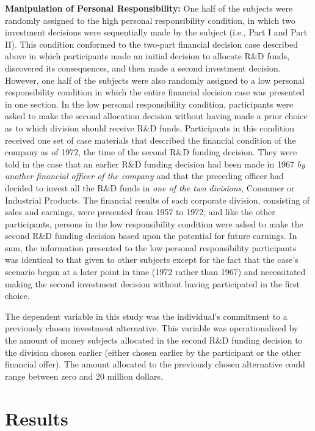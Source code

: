 \documentclass{article}
\begin{document}
\textbf{Manipulation of Personal Responsibility:} One half of the subjects were randomly assigned to the high personal responsibility condition, in which two investment decisions were sequentially made by the subject (i.e., Part I and Part II). This condition conformed to the two-part financial decision case described above in which participants made an initial decision to allocate R\&D funds, discovered its consequences, and then made a second investment decision. However, one half of the subjects were also randomly assigned to a low personal responsibility condition in which the entire financial decision case was presented in one section. In the low personal responsibility condition, participants were asked to make the second allocation decision without having made a prior choice as to which division should receive R\&D funds. Participants in this condition received one set of case materials that described the financial condition of the company as of 1972, the time of the second R\&D funding decision. They were told in the case that an earlier R\&D funding decision had been made in 1967 \textit{by another financial officer of the company} and that the preceding officer had decided to invest all the R\&D funds in \textit{one of the two divisions}, Consumer or Industrial Products. The financial results of each corporate division, consisting of sales and earnings, were presented from 1957 to 1972, and like the other participants, persons in the low responsibility condition were asked to make the second R\&D funding decision based upon the potential for future earnings. In sum, the information presented to the low personal responsibility participants was identical to that given to other subjects except for the fact that the case's scenario began at a later point in time (1972 rather than 1967) and necessitated making the second investment decision without having participated in the first choice.

The dependent variable in this study was the individual's commitment to a previously chosen investment alternative. This variable was operationalized by the amount of money subjects allocated in the second R\&D funding decision to the division chosen earlier (either chosen earlier by the participant or the other financial offer). The amount allocated to the previously chosen alternative could range between zero and 20 million dollars.

\newpage

\section{Results}
\end{document}
